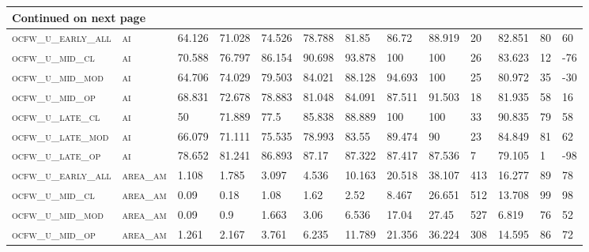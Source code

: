 \begin{landscape}
\begin{center}
\begin{footnotesize}
\begin{longtable}{lllllllllllll}
\hline \multicolumn{13}{|l|}{{Continued on next page}} \\ \hline
\endfoot

\hline \hline
\endlastfoot


\textsc{ocfw\_u\_early\_all} & \textsc{ai        }   & 64.126   & 71.028   & 74.526   & 78.788   & 81.85    & 86.72    & 88.919    & 20     & 82.851        & 80            & 60       \\
\textsc{ocfw\_u\_mid\_cl   } & \textsc{ai        }   & 70.588   & 76.797   & 86.154   & 90.698   & 93.878   & 100      & 100       & 26     & 83.623        & 12            & -76      \\
\textsc{ocfw\_u\_mid\_mod  } & \textsc{ai        }   & 64.706   & 74.029   & 79.503   & 84.021   & 88.128   & 94.693   & 100       & 25     & 80.972        & 35            & -30      \\
\textsc{ocfw\_u\_mid\_op   } & \textsc{ai        }   & 68.831   & 72.678   & 78.883   & 81.048   & 84.091   & 87.511   & 91.503    & 18     & 81.935        & 58            & 16       \\
\textsc{ocfw\_u\_late\_cl  } & \textsc{ai        }   & 50       & 71.889   & 77.5     & 85.838   & 88.889   & 100      & 100       & 33     & 90.835        & 79            & 58       \\
\textsc{ocfw\_u\_late\_mod } & \textsc{ai        }   & 66.079   & 71.111   & 75.535   & 78.993   & 83.55    & 89.474   & 90        & 23     & 84.849        & 81            & 62       \\
\textsc{ocfw\_u\_late\_op  } & \textsc{ai        }   & 78.652   & 81.241   & 86.893   & 87.17    & 87.322   & 87.417   & 87.536    & 7      & 79.105        & 1             & -98      \\
\textsc{ocfw\_u\_early\_all} & \textsc{area\_am  }   & 1.108    & 1.785    & 3.097    & 4.536    & 10.163   & 20.518   & 38.107    & 413    & 16.277        & 89            & 78       \\
\textsc{ocfw\_u\_mid\_cl   } & \textsc{area\_am  }   & 0.09     & 0.18     & 1.08     & 1.62     & 2.52     & 8.467    & 26.651    & 512    & 13.708        & 99            & 98       \\
\textsc{ocfw\_u\_mid\_mod  } & \textsc{area\_am  }   & 0.09     & 0.9      & 1.663    & 3.06     & 6.536    & 17.04    & 27.45     & 527    & 6.819         & 76            & 52       \\
\textsc{ocfw\_u\_mid\_op   } & \textsc{area\_am  }   & 1.261    & 2.167    & 3.761    & 6.235    & 11.789   & 21.356   & 36.224    & 308    & 14.595        & 86            & 72       \\

\end{longtable}
\end{footnotesize}
\end{center}
\end{landscape}
